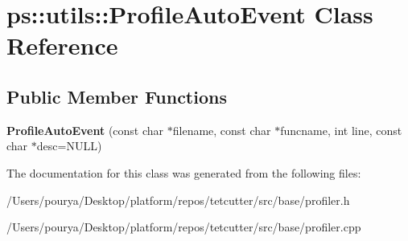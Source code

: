 \hypertarget{classps_1_1utils_1_1ProfileAutoEvent}{}\section{ps\+:\+:utils\+:\+:Profile\+Auto\+Event Class Reference}
\label{classps_1_1utils_1_1ProfileAutoEvent}
\subsection*{Public Member Functions}
\begin{DoxyCompactItemize}
\item 
\hypertarget{classps_1_1utils_1_1ProfileAutoEvent_a2f456e4ac23ef9345b730a8fcc55a707}{}{\bfseries Profile\+Auto\+Event} (const char $\ast$filename, const char $\ast$funcname, int line, const char $\ast$desc=N\+U\+L\+L)\label{classps_1_1utils_1_1ProfileAutoEvent_a2f456e4ac23ef9345b730a8fcc55a707}

\end{DoxyCompactItemize}


The documentation for this class was generated from the following files\+:\begin{DoxyCompactItemize}
\item 
/\+Users/pourya/\+Desktop/platform/repos/tetcutter/src/base/profiler.\+h\item 
/\+Users/pourya/\+Desktop/platform/repos/tetcutter/src/base/profiler.\+cpp\end{DoxyCompactItemize}
